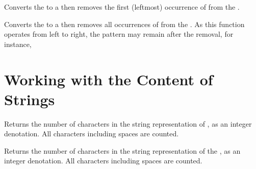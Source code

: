 \documentclass[oneside]{book}
\begin{document}
\begin{function}{\strVarRemoveOnce}
\begin{syntax}
  
\end{syntax}
Converts the  to a  then
removes the first (leftmost) occurrence of  from the .
\begin{demohigh}
\strSet {}
\strVarRemoveOnce {}
\strUse \lTmpaStr
\end{demohigh}
\end{function}

\begin{function}{\strVarRemoveAll}
\begin{syntax}
  
\end{syntax}
Converts the  to a  then
removes all occurrences of  from the .
As this function operates from left to right,
the pattern  may remain after the removal, for instance,
\begin{demohigh}
\strSet {}
\strVarRemoveAll {}
\tlUse \lTmpaStr
\end{demohigh}
\end{function}

\section{Working with the Content of Strings}

\begin{function}{\strCount}
\begin{syntax}
 
\end{syntax}
Returns the number of characters in the string representation of ,
as an integer denotation. All characters including spaces are counted.
\begin{demohigh}
\end{demohigh}
\end{function}

\begin{function}{\StVarCount}
\begin{syntax}
 
\end{syntax}
Returns the number of characters in the string representation of the ,
as an integer denotation. All characters including spaces are counted.
\begin{demohigh}
\strSet {}
\strVarCount \lTmpaStr
\end{demohigh}
\end{function}
\end{document}
